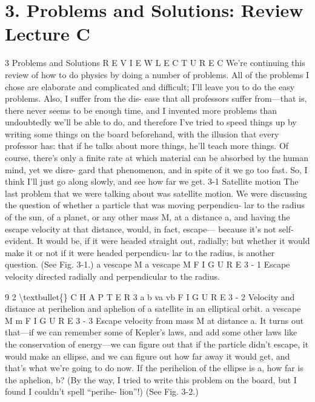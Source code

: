 \documentclass[10pt,oneside]{article}
\begin{document}
\section*{3. Problems and Solutions: Review Lecture C}
\label{tips-sec-11-3-problems-and-solutions-review-lecture-c}
3 Problems and Solutions R E V I E W  L E C T U R E  C We’re continuing this review of how to do physics by doing a number of problems. All of the problems I chose are elaborate and complicated and difficult; I’ll leave you to do the easy problems. Also, I suffer from the dis- ease that all professors suffer from---that is, there never seems to be enough time, and I invented more problems than undoubtedly we’ll be able to do, and therefore I’ve tried to speed things up by writing some things on the board beforehand, with the illusion that every professor has: that if he talks about more things, he’ll teach more things. Of course, there’s only a finite rate at which material can be absorbed by the human mind, yet we disre- gard that phenomenon, and in spite of it we go too fast. So, I think I’ll just go along slowly, and see how far we get. 3-1 Satellite motion The last problem that we were talking about was satellite motion. We were discussing the question of whether a particle that was moving perpendicu- lar to the radius of the sun, of a planet, or any other mass M, at a distance a, and having the escape velocity at that distance, would, in fact, escape--- because it’s not self-evident. It would be, if it were headed straight out, radially; but whether it would make it or not if it were headed perpendicu- lar to the radius, is another question. (See Fig. 3-1.) a vescape M a vescape M F I G U R E  3 - 1 Escape velocity directed radially and perpendicular to the radius.\par

9 2 \textbackslash{}textbullet\{\} C H A P T E R  3 a b va vb F I G U R E  3 - 2 Velocity and distance at perihelion and aphelion of a satellite in an elliptical orbit. a vescape M m F I G U R E  3 - 3 Escape velocity from mass M at distance a. It turns out that---if we can remember some of Kepler’s laws, and add some other laws like the conservation of energy---we can figure out that if the particle didn’t escape, it would make an ellipse, and we can figure out how far away it would get, and that’s what we’re going to do now. If the perihelion of the ellipse is a, how far is the aphelion, b? (By the way, I tried to write this problem on the board, but I found I couldn’t spell “perihe- lion”!) (See Fig. 3-2.)\par
\end{document}
